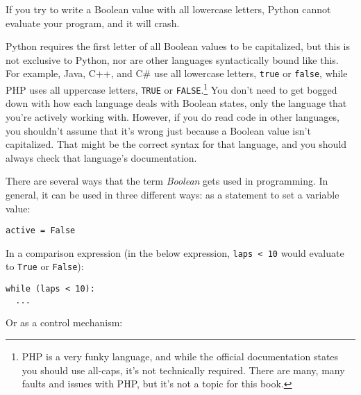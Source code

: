 If you try to write a Boolean value with all lowercase letters, Python cannot evaluate your program, and it will crash.\par
Python requires the first letter of all Boolean values to be capitalized, but this is not exclusive to Python, nor are other languages syntactically bound like this. For example, Java, C++, and C\# use all lowercase letters, \verb|true| or \verb|false|, while PHP uses all uppercase letters, \verb|TRUE| or \verb|FALSE|.\footnote{PHP is a very funky language, and while the official documentation states you should use all-caps, it's not technically required. There are many, many faults and issues with PHP, but it's not a topic for this book.} You don't need to get bogged down with how each language deals with Boolean states, only the language that you're actively working with. However, if you do read code in other languages, you shouldn't assume that it's wrong just because a Boolean value isn't capitalized. That might be the correct syntax for that language, and you should always check that language's documentation.\par
{}\par
There are several ways that the term \textit{Boolean} gets used in programming. In general, it can be used in three different ways: as a statement to set a variable value:

\begin{lstlisting}[style=pippython]
active = False
\end{lstlisting}

In a comparison expression (in the below expression, \verb|laps < 10| would evaluate to \verb|True| or \verb|False|):

\begin{lstlisting}[style=pippython]
while (laps < 10):
  ...
\end{lstlisting}

Or as a control mechanism:

